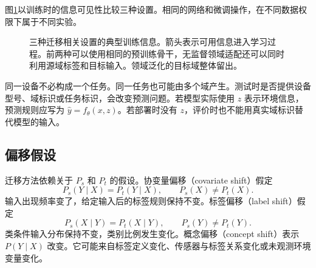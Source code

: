 图\ref{fig:transfer-source-target}以训练时的信息可见性比较三种设置。相同的网络和微调操作，在不同数据权限下属于不同实验。
\begin{figure}[htbp]
\centering
{}
\caption{三种迁移相关设置的典型训练信息。箭头表示可用信息进入学习过程。前两种可以使用相同的预训练骨干，无监督领域适配还可以同时利用源域标签和目标输入。领域泛化的目标域整体留出。}
\label{fig:transfer-source-target}
\end{figure}

同一设备不必构成一个任务。同一任务也可能由多个域产生。测试时是否提供设备型号、域标识或任务标识，会改变预测问题。若模型实际使用 $z$ 表示环境信息，预测规则应写为 $\hat y=f_\theta(x,z)$。若部署时没有 $z$，评价时也不能用真实域标识替代模型的输入。

\subsection{偏移假设}
迁移方法依赖关于 $P_s$ 和 $P_t$ 的假设。协变量偏移（covariate shift）假定
\begin{equation}
 P_s(Y\mid X)=P_t(Y\mid X),\qquad P_s(X)\ne P_t(X).
\label{eq:transfer-covariate-shift}
\end{equation}
输入出现频率变了，给定输入后的标签规则保持不变。标签偏移（label shift）假定
\begin{equation}
 P_s(X\mid Y)=P_t(X\mid Y),\qquad P_s(Y)\ne P_t(Y).
\label{eq:transfer-label-shift}
\end{equation}
类条件输入分布保持不变，类别比例发生变化。概念偏移（concept shift）表示 $P(Y\mid X)$ 改变。它可能来自标签定义变化、传感器与标签关系变化或未观测环境变量变化。

